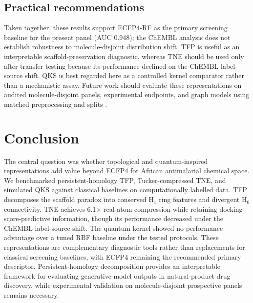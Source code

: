 \documentclass[11pt,a4paper]{article}
\begin{document}
\subsection{Practical recommendations}

Taken together, these results support ECFP4-RF as the primary screening baseline for the present panel (AUC \num{0.948}); the ChEMBL analysis does not establish robustness to molecule-disjoint distribution shift. TFP is useful as an interpretable scaffold-preservation diagnostic, whereas TNE should be used only after transfer testing because its performance declined on the ChEMBL label-source shift. QKS is best regarded here as a controlled kernel comparator rather than a mechanistic assay. Future work should evaluate these representations on audited molecule-disjoint panels, experimental endpoints, and graph models using matched preprocessing and splits \citep{topologynet_2018}.


\section{Conclusion}

The central question was whether topological and quantum-inspired representations add value beyond ECFP4 for African antimalarial chemical space. We benchmarked persistent-homology TFP, Tucker-compressed TNE, and simulated QKS against classical baselines on computationally labelled data. TFP decomposes the scaffold paradox into conserved H$_1$ ring features and divergent H$_0$ connectivity. TNE achieves \num{6.1}$\times$ real-atom compression while retaining docking-score-predictive information, though its performance decreased under the ChEMBL label-source shift. The quantum kernel showed no performance advantage over a tuned RBF baseline under the tested protocols. These representations are complementary diagnostic tools rather than replacements for classical screening baselines, with ECFP4 remaining the recommended primary descriptor. Persistent-homology decomposition provides an interpretable framework for evaluating generative-model outputs in natural-product drug discovery, while experimental validation on molecule-disjoint prospective panels remains necessary.

\end{document}
